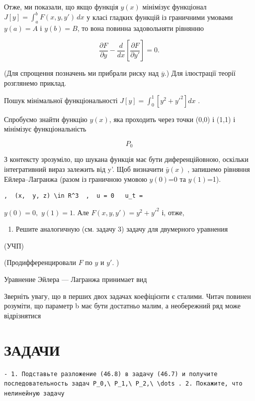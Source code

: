 \documentclass[
  ukrainian,
]{article}
\providecommand{\tightlist}{%
  \setlength{\itemsep}{0pt}\setlength{\parskip}{0pt}}
\begin{document}
Отже, ми показали, що якщо функція \(y(x)\) мінімізує функціонал
\(J[y] = \int_a^b F(x,y,y')\,dx\) у класі гладких функцій із граничними
умовами \(y(a)=A\) і \(y(b)=B\), то вона повинна задовольняти рівнянню

\[
\frac{\partial F}{\partial y} - \frac{d}{dx}\left[\frac{\partial F}{\partial y'}\right] = 0.
\]

(Для спрощення позначень ми прибрали риску над \(\overline{y}\).) Для
ілюстрації теорії розглянемо приклад.

Пошук мінімальної функціональності
\(J[y] = \int_{0}^{1} [y^2 + y'^2] dx\) .

Спробуємо знайти функцію \(y(x)\), яка проходить через точки (0,0) і
(1,1) і мінімізує функціональність

\[
P_{0}
\]

З контексту зрозуміло, що шукана функція має бути диференційовною,
оскільки інтегративний вираз залежить від y'. Щоб визначити
\(\bar{y}(x)\) , запишемо рівняння Ейлера--Лагранжа (разом із граничною
умовою \(y(0)\)=0 та \(y(1)\)=1).

\begin{verbatim}
,  (x,  y, z) \in R^3  ,  u = 0   u_t =
\end{verbatim}

\(y(0) = 0,\) \(y(1) = 1.\) Але \(F(x, y, y') = y^2 + y'^2\) і, отже,

\begin{enumerate}
\def\labelenumi{\arabic{enumi}.}
\setcounter{enumi}{3}
\tightlist
\item
  Решите аналогичную (см. задачу 3) задачу для двумерного уравнения
\end{enumerate}

(УЧП)

(Продифференцировали \(F\) по \(y\) и \(y'.\) )

Уравнение Эйлера --- Лагранжа принимает вид

Зверніть увагу, що в перших двох задачах коефіцієнти є сталими. Читач
повинен розуміти, що параметр b має бути достатньо малим, а необережний
ряд може відрізнятися

\section{ЗАДАЧИ}\label{ux437ux430ux434ux430ux447ux438}

\begin{verbatim}
- 1. Подставьте разложение (46.8) в задачу (46.7) и получите последовательность задач P_0,\ P_1,\ P_2,\ \dots . 2. Покажите, что нелинейную задачу
\end{verbatim}
\end{document}
